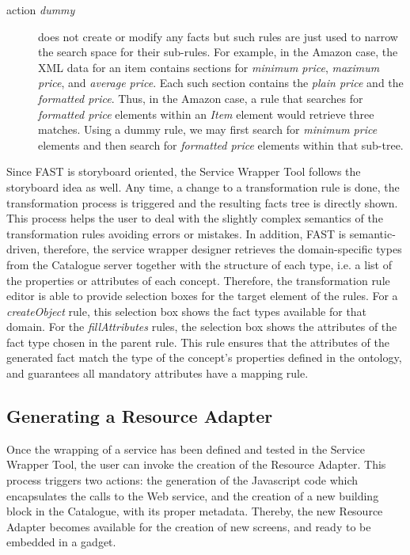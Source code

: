 \documentclass{fast_latex}
\begin{document}
\begin{description}
	\item[action \emph{dummy}] does not create or modify any facts but such rules are just used to narrow the search space for their sub-rules. For example, in the Amazon case, the XML data for an item contains sections for \emph{minimum price}, \emph{maximum price}, and \emph{average price}. Each such section contains the \emph{plain price} and the \emph{formatted price}. Thus, in the Amazon case, a rule that searches for \emph{formatted price} elements within an \emph{Item} element would retrieve three matches. Using a dummy rule, we may first search for \emph{minimum price} elements and then search for \emph{formatted price} elements within that sub-tree.
\end{description}

Since FAST is storyboard oriented, the Service Wrapper Tool follows the storyboard idea as well. Any time, a change to a transformation rule is done, the transformation process is triggered and the resulting facts tree is directly shown. This process helps the user to deal with the slightly complex semantics of the transformation rules avoiding errors or mistakes. In addition, FAST is semantic-driven, therefore, the service wrapper designer retrieves the domain-specific types from the Catalogue server together with the structure of each type, i.e. a list of the properties or attributes of each concept. Therefore, the transformation rule editor is able to provide selection boxes for the target element of the rules. For a \emph{createObject} rule, this selection box shows the fact types available for that domain. For the \emph{fillAttributes} rules, the selection box shows the attributes of the fact type chosen in the parent rule. This rule ensures that the attributes of the generated fact match the type of the concept's properties defined in the ontology, and guarantees all mandatory attributes have a mapping rule.




\subsection{Generating a Resource Adapter} %
\label{sub:generating_a_resource_adapter}

Once the wrapping of a service has been defined and tested in the Service Wrapper Tool, the user can invoke the creation of the Resource Adapter. This process triggers two actions: the generation of the Javascript code which encapsulates the calls to the Web service, and the creation of a new building block in the Catalogue, with its proper metadata. Thereby, the new Resource Adapter becomes available for the creation of new screens, and ready to be embedded in a gadget.
\end{document}
